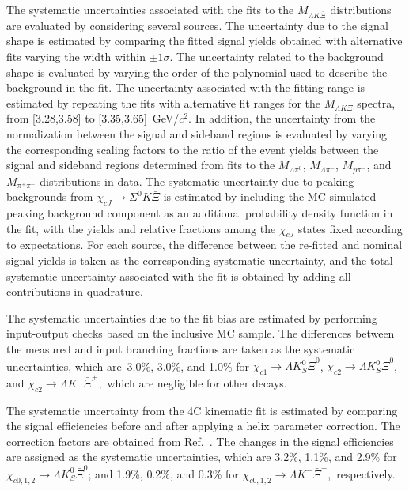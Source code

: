 \documentclass[amsmath,amssymb,twocolumn,prd,floatfix,showpacs,nofootinbib]{revtex4-1}
\begin{document}
The systematic uncertainties associated with the fits to the $M_{\Lambda K \bar{\Xi}}$ distributions are evaluated by considering several sources. The uncertainty due to the signal shape is estimated by comparing the fitted signal yields obtained with alternative fits varying the width within $\pm1\sigma$. The uncertainty related to the background shape is evaluated by varying the order of the polynomial used to describe the background in the fit. The uncertainty associated with the fitting range is estimated by repeating the fits with alternative fit ranges for the $M_{\Lambda K \bar{\Xi}}$ spectra, from [3.28,3.58] to [3.35,3.65]~GeV/$c^2$. In addition, the uncertainty from the normalization between the signal and sideband regions is evaluated by varying the corresponding scaling factors to the ratio of the event yields between the signal and sideband regions determined from fits to the $M_{\Lambda\pi^0}$, $M_{\Lambda\pi^-}$, $M_{p\pi^-}$, and $M_{\pi^+\pi^-}$ distributions in data. The systematic uncertainty due to peaking backgrounds from $\chi_{cJ}\to\Sigma^0K\bar{\Xi}$ is estimated by including the MC-simulated peaking background component as an additional probability density function in the fit, with the yields and relative fractions among the $\chi_{cJ}$ states fixed according to expectations. For each source, the difference between the re-fitted and nominal signal yields is taken as the corresponding systematic uncertainty, and the total systematic uncertainty associated with the fit is obtained by adding all contributions in quadrature.

The systematic uncertainties due to the fit bias are estimated by performing input-output checks based on the inclusive MC sample.
The differences between the measured and input branching fractions are taken as the systematic uncertainties,
which are~3.0\%, 3.0\%, and 1.0\% for  $\chi_{c1}\to \Lambda K^0_S\bar \Xi^0$, $\chi_{c2}\to \Lambda K^0_S\bar \Xi^0$, and $\chi_{c2}\to \Lambda K^-\bar \Xi^+$,~which are negligible for other decays. 

The systematic uncertainty from the 4C kinematic fit is estimated by comparing the signal efficiencies before and after applying a helix parameter correction.
The correction factors are obtained from Ref.~\cite{ref::helixp}.
The changes in the signal efficiencies are assigned as the systematic uncertainties, which are 3.2\%, 1.1\%, and 2.9\% for $\chi_{c0,1,2}\to \Lambda K^0_S\bar \Xi^0$; and 1.9\%, 0.2\%, and 0.3\% for $\chi_{c0,1,2}\to \Lambda K^-\bar \Xi^+$,~respectively.
\end{document}
